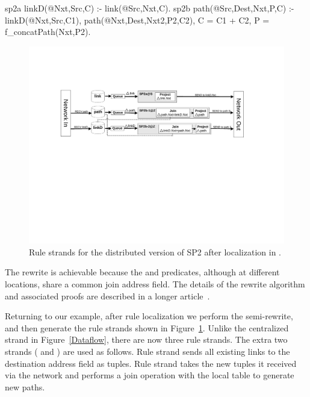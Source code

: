 \begin{NDlog}
sp2a  linkD(@Nxt,Src,C) :- link(@Src,Nxt,C).
sp2b  path(@Src,Dest,Nxt,P,C) :- linkD(@Nxt,Src,C1), 
          path(@Nxt,Dest,Nxt2,P2,C2), C = C1 + C2,                               
          P = f_concatPath(Nxt,P2).
\end{NDlog}


\begin{figure}[ht]
\centering
  \includegraphics[width=5in]{graphs/dataflow1.pdf}
\caption{\label{Dataflow1}{\small Rule strands for the distributed
    version of SP2 after localization in \Sys. }}
\end{figure}                                        

The rewrite is achievable because the  and  predicates,
although at different locations, share a common join address
field. The details of the rewrite algorithm and associated proofs are
described in a longer article~\cite{declareNetworks}.

Returning to our example, after rule localization we perform the 
semi-\naive rewrite, and then generate the rule strands shown in
Figure~\ref{Dataflow1}.  Unlike the centralized strand in
Figure~\ref{Dataflow}, there are now three rule strands. The extra two
strands ( and ) are used as follows. Rule strand
 sends all existing links to the destination address field
as  tuples.  Rule strand  takes the new 
tuples it received via the network and performs a join operation with
the local  table to generate new paths.


